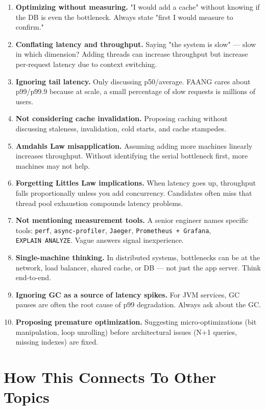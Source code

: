 \documentclass[11pt]{article}
\begin{document}
\begin{enumerate}
\def\labelenumi{\arabic{enumi}.}
\item
  \textbf{Optimizing without measuring.} "I would add a cache" without knowing if the DB is even the bottleneck. Always state "first I would measure to confirm."
\item
  \textbf{Conflating latency and throughput.} Saying "the system is slow" --- slow in which dimension? Adding threads can increase throughput but increase per-request latency due to context switching.
\item
  \textbf{Ignoring tail latency.} Only discussing p50/average. FAANG cares about p99/p99.9 because at scale, a small percentage of slow requests is millions of users.
\item
  \textbf{Not considering cache invalidation.} Proposing caching without discussing staleness, invalidation, cold starts, and cache stampedes.
\item
  \textbf{Amdahl\textquotesingle s Law misapplication.} Assuming adding more machines linearly increases throughput. Without identifying the serial bottleneck first, more machines may not help.
\item
  \textbf{Forgetting Little\textquotesingle s Law implications.} When latency goes up, throughput falls proportionally unless you add concurrency. Candidates often miss that thread pool exhaustion compounds latency problems.
\item
  \textbf{Not mentioning measurement tools.} A senior engineer names specific tools: \texttt{perf}, \texttt{async-profiler}, \texttt{Jaeger}, \texttt{Prometheus\ +\ Grafana}, \texttt{EXPLAIN\ ANALYZE}. Vague answers signal inexperience.
\item
  \textbf{Single-machine thinking.} In distributed systems, bottlenecks can be at the network, load balancer, shared cache, or DB --- not just the app server. Think end-to-end.
\item
  \textbf{Ignoring GC as a source of latency spikes.} For JVM services, GC pauses are often the root cause of p99 degradation. Always ask about the GC.
\item
  \textbf{Proposing premature optimization.} Suggesting micro-optimizations (bit manipulation, loop unrolling) before architectural issues (N+1 queries, missing indexes) are fixed.
\end{enumerate}

\section{How This Connects To Other Topics}\label{how-this-connects-to-other-topics}
\end{document}
